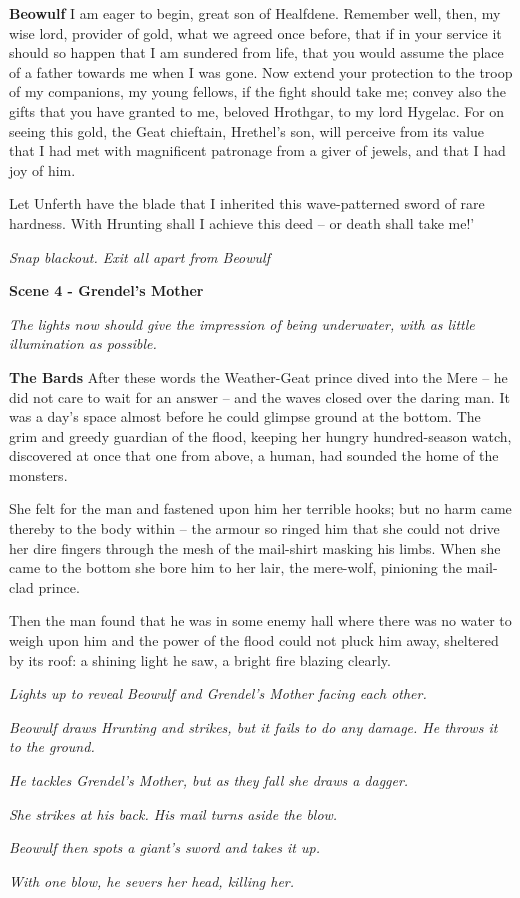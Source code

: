 \documentclass[a4paper]{article}
\begin{document}
{\textbf{Beowulf} I am eager to begin, great son of Healfdene.
Remember well, then, my wise lord,
provider of gold, what we agreed once before,
that if in your service it should so happen
that I am sundered from life, that you would assume the place
of a father towards me when I was gone.
Now extend your protection to the troop of my companions,
my young fellows, if the fight should take me;
convey also the gifts that you have granted to me,
beloved Hrothgar, to my lord Hygelac.
For on seeing this gold, the Geat chieftain,
Hrethel's son, will perceive from its value
that I had met with magnificent patronage
from a giver of jewels, and that I had joy of him.

Let Unferth have the blade that I inherited
this wave-patterned sword
of rare hardness. With Hrunting shall I
achieve this deed – or death shall take me!'

\centerline{\textit{Snap blackout. Exit all apart from Beowulf}}

\newpage
\centerline{\textbf{Scene 4 - Grendel's Mother}}

\centerline{\textit{The lights now should give the impression of being underwater, with as little illumination as possible.}}

\textbf{The Bards} After these words the Weather-Geat prince
dived into the Mere – he did not care
to wait for an answer – and the waves closed over
the daring man. It was a day's space almost
before he could glimpse ground at the bottom.
The grim and greedy guardian of the flood,
keeping her hungry hundred-season watch,
discovered at once that one from above,
a human, had sounded the home of the monsters.

She felt for the man and fastened upon him
her terrible hooks; but no harm came thereby
to the body within – the armour so ringed him
that she could not drive her dire fingers
through the mesh of the mail-shirt masking his limbs.
When she came to the bottom she bore him to her lair,
the mere-wolf, pinioning the mail-clad prince.

Then the man found
that he was in some enemy hall
where there was no water to weigh upon him
and the power of the flood could not pluck him away,
sheltered by its roof: a shining light he saw,
a bright fire blazing clearly.

\centerline{\textit{Lights up to reveal Beowulf and Grendel's Mother facing each other.}}

\centerline{\textit{Beowulf draws Hrunting and strikes, but it fails to do any damage. He throws it to the ground.}}
\centerline{\textit{He tackles Grendel's Mother, but as they fall she draws a dagger.}}
\centerline{\textit{She strikes at his back. His mail turns aside the blow.}}
\centerline{\textit{Beowulf then spots a giant's sword and takes it up.}}
\centerline{\textit{With one blow, he severs her head, killing her.}}

}
\end{document}
